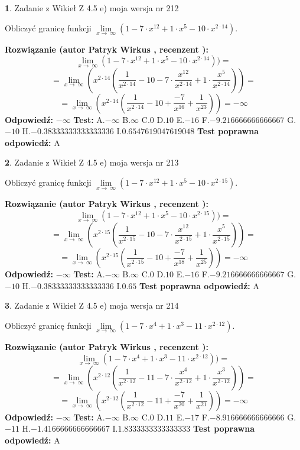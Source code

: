 \documentclass[12pt, a4paper]{article}
\theoremstyle{definition} %
\newtheorem{zad}{}
\newcommand{\zadStart}[1]{\begin{zad}#1\newline}
\newcommand{\zadStop}{\end{zad}}
\newcommand{\rozwStart}[2]{\noindent \textbf{Rozwiązanie (autor #1 , recenzent #2): }\newline}
\newcommand{\rozwStop}{\newline}
\newcommand{\odpStart}{\noindent \textbf{Odpowiedź:}\newline}
\newcommand{\odpStop}{\newline}
\newcommand{\testStart}{\noindent \textbf{Test:}\newline}
\newcommand{\testStop}{\newline}
\newcommand{\kluczStart}{\noindent \textbf{Test poprawna odpowiedź:}\newline}
\newcommand{\kluczStop}{\newline}
\begin{document}
\zadStart{Zadanie z Wikieł Z 4.5 e) moja wersja nr 212}


Obliczyć granicę funkcji  $\lim\limits_{x\to\ \infty}(1 - 7 \cdot x^{12}+1 \cdot x^{5}- 10 \cdot x^{2\cdot14})$.
\zadStop
\rozwStart{Patryk Wirkus}{}
$$\lim\limits_{x\to\ \infty}(1 - 7 \cdot x^{12}+1 \cdot x^{5}- 10 \cdot x^{2\cdot14}))=$$
$$=\lim\limits_{x\to\ \infty}(x^{2\cdot14}(\frac{1}{x^{2\cdot14}}-10 -7 \cdot \frac{x^{12}}{x^{2\cdot14}}+1 \cdot \frac{x^{5}}{x^{2\cdot14}}))=$$
$$=\lim\limits_{x\to\ \infty}(x^{2\cdot14}(\frac{1}{x^{2\cdot14}}-10 + \frac{-7}{x^{16}}+ \frac{1}{x^{23}}))=-\infty$$
\rozwStop
\odpStart
$-\infty$
\odpStop
\testStart
A.$-\infty$ B.$\infty$ C.$0$ D.$10$ E.$-16$
F.$-9.216666666666667$ G.$-10$
H.$-0.38333333333333336$
I.$0.6547619047619048$
\testStop
\kluczStart
A
\kluczStop



\zadStart{Zadanie z Wikieł Z 4.5 e) moja wersja nr 213}


Obliczyć granicę funkcji  $\lim\limits_{x\to\ \infty}(1 - 7 \cdot x^{12}+1 \cdot x^{5}- 10 \cdot x^{2\cdot15})$.
\zadStop
\rozwStart{Patryk Wirkus}{}
$$\lim\limits_{x\to\ \infty}(1 - 7 \cdot x^{12}+1 \cdot x^{5}- 10 \cdot x^{2\cdot15}))=$$
$$=\lim\limits_{x\to\ \infty}(x^{2\cdot15}(\frac{1}{x^{2\cdot15}}-10 -7 \cdot \frac{x^{12}}{x^{2\cdot15}}+1 \cdot \frac{x^{5}}{x^{2\cdot15}}))=$$
$$=\lim\limits_{x\to\ \infty}(x^{2\cdot15}(\frac{1}{x^{2\cdot15}}-10 + \frac{-7}{x^{18}}+ \frac{1}{x^{25}}))=-\infty$$
\rozwStop
\odpStart
$-\infty$
\odpStop
\testStart
A.$-\infty$ B.$\infty$ C.$0$ D.$10$ E.$-16$
F.$-9.216666666666667$ G.$-10$
H.$-0.38333333333333336$
I.$0.65$
\testStop
\kluczStart
A
\kluczStop



\zadStart{Zadanie z Wikieł Z 4.5 e) moja wersja nr 214}


Obliczyć granicę funkcji  $\lim\limits_{x\to\ \infty}(1 - 7 \cdot x^{4}+1 \cdot x^{3}- 11 \cdot x^{2\cdot12})$.
\zadStop
\rozwStart{Patryk Wirkus}{}
$$\lim\limits_{x\to\ \infty}(1 - 7 \cdot x^{4}+1 \cdot x^{3}- 11 \cdot x^{2\cdot12}))=$$
$$=\lim\limits_{x\to\ \infty}(x^{2\cdot12}(\frac{1}{x^{2\cdot12}}-11 -7 \cdot \frac{x^{4}}{x^{2\cdot12}}+1 \cdot \frac{x^{3}}{x^{2\cdot12}}))=$$
$$=\lim\limits_{x\to\ \infty}(x^{2\cdot12}(\frac{1}{x^{2\cdot12}}-11 + \frac{-7}{x^{20}}+ \frac{1}{x^{21}}))=-\infty$$
\rozwStop
\odpStart
$-\infty$
\odpStop
\testStart
A.$-\infty$ B.$\infty$ C.$0$ D.$11$ E.$-17$
F.$-8.916666666666666$ G.$-11$
H.$-1.4166666666666667$
I.$1.8333333333333333$
\testStop
\kluczStart
A
\kluczStop
\end{document}
